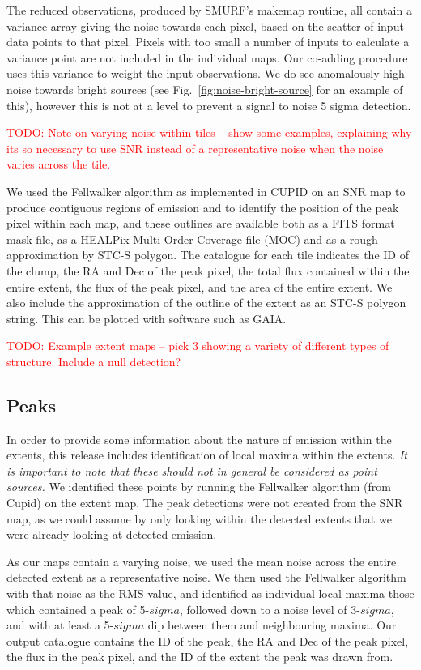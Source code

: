 \documentclass[twocolumn]{aastex6}
\newcommand{\todo}[1]{\textcolor{red}{TODO: #1}}
\begin{document}
The reduced observations, produced by SMURF's makemap routine, all
contain a variance array giving the noise towards each pixel, based on
the scatter of input data points to that pixel. Pixels with too small
a number of inputs to calculate a variance point are not included in
the individual maps. Our co-adding procedure uses this variance to
weight the input observations. We do see anomalously high noise
towards bright sources (see Fig.~\ref{fig:noise-bright-source} for an
example of this), however this is not at a level to prevent a signal
to noise 5 sigma detection.

\todo{Note on varying noise within tiles -- show some examples,
  explaining why its so necessary to use SNR instead of a
  representative noise when the noise varies across the tile.}

We used the Fellwalker algorithm as implemented in CUPID on an SNR map
to produce contiguous regions of emission and to identify the position
of the peak pixel within each map, and these outlines are available
both as a FITS format mask file, as a HEALPix Multi-Order-Coverage
file (MOC) and as a rough approximation by STC-S polygon. The
catalogue for each tile indicates the ID of the clump, the RA and Dec
of the peak pixel, the total flux contained within the entire extent,
the flux of the peak pixel, and the area of the entire extent. We also
include the approximation of the outline of the extent as an STC-S
polygon string. This can be plotted with software such as GAIA.



\todo{Example extent maps -- pick 3 showing a variety of different
  types of structure. Include a null detection?}

\subsection{Peaks}
In order to provide some information about the nature of emission
within the extents, this release includes identification of local
maxima within the extents. \emph{It is important to note that these
  should not in general be considered as point sources.} We identified
these points by running the Fellwalker algorithm (from Cupid) on the
extent map. The peak detections were not created from the SNR map, as
we could assume by only looking within the detected extents that we
were already looking at detected emission.

As our maps contain a varying noise, we used the mean noise across the
entire detected extent as a representative noise. We then used the
Fellwalker algorithm with that noise as the RMS value, and identified
as individual local maxima those which contained a peak of 5-$sigma$,
followed down to a noise level of 3-$sigma$, and with at least a
5-$sigma$ dip between them and neighbouring maxima. Our output
catalogue contains the ID of the peak, the RA and Dec of the peak
pixel, the flux in the peak pixel, and the ID of the extent the peak
was drawn from.
\end{document}
